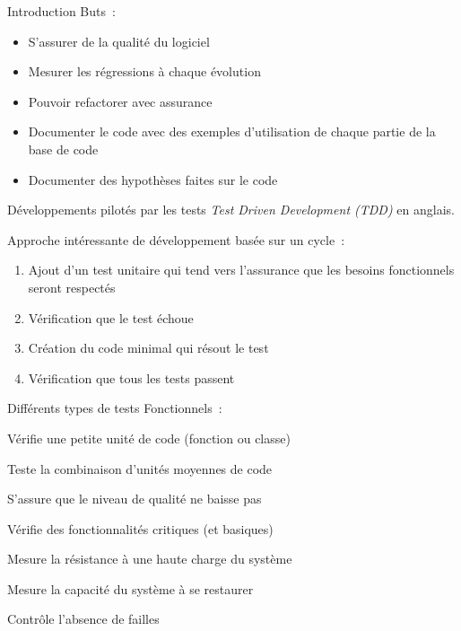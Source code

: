 \begin{frame}{Introduction}
  Buts~:
  \begin{itemize}[<+->]
    \item S'assurer de la qualité du logiciel
    \item Mesurer les régressions à chaque évolution
    \item Pouvoir refactorer avec assurance
    \item Documenter le code avec des exemples d'utilisation de chaque partie de la base de code
    \item Documenter des hypothèses faites sur le code
  \end{itemize}
\end{frame}

\begin{frame}{Développements pilotés par les tests}
  \emph{Test Driven Development (TDD)} en anglais.
  
  Approche intéressante de développement basée sur un cycle~:

  \begin{enumerate}[<+->]
    \item Ajout d'un test unitaire qui tend vers l'assurance que les besoins fonctionnels seront respectés
    \item Vérification que le test échoue
    \item Création du code minimal qui résout le test
    \item Vérification que tous les tests passent
  \end{enumerate}
\end{frame}

\begin{frame}{Différents types de tests}
  Fonctionnels~:

  \begin{description}[<+->]
    \item[Unitaire] Vérifie une petite unité de code (fonction ou classe)
    \item[Intégration] Teste la combinaison d'unités moyennes de code
    \item[Régression] S'assure que le niveau de qualité ne baisse pas
    \item[Smoke] Vérifie des fonctionnalités critiques (et basiques)
  \end{description}


  \begin{description}[<+->]
    \item[Stress] Mesure la résistance à une haute charge du système
    \item[Récupération] Mesure la capacité du système à se restaurer
    \item[Sécurité] Contrôle l'absence de failles
    \item[…]
  \end{description}
\end{frame}

